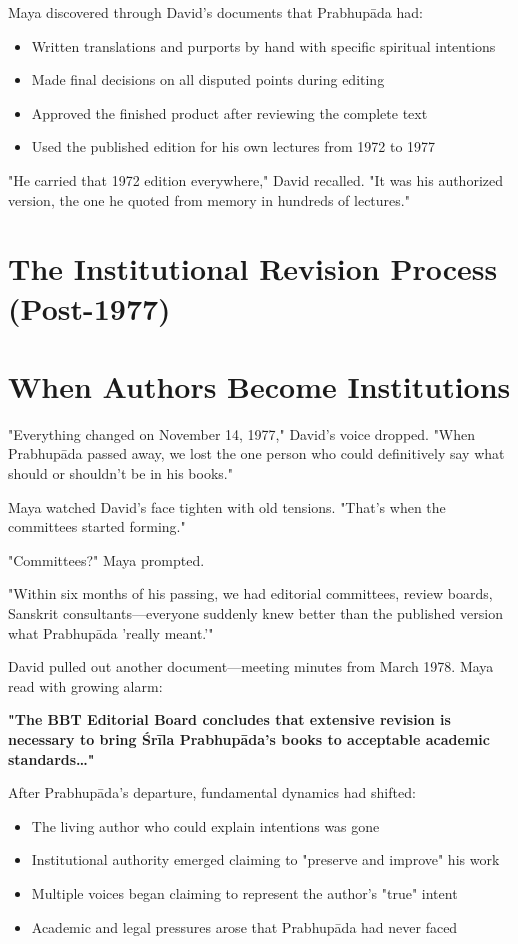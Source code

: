 \documentclass[11pt,twoside]{book}
\begin{document}
Maya discovered through David's documents that Prabhupāda had:
\begin{itemize}
\item Written translations and purports by hand with specific spiritual intentions
\item Made final decisions on all disputed points during editing
\item Approved the finished product after reviewing the complete text
\item Used the published edition for his own lectures from 1972 to 1977
\end{itemize}

"He carried that 1972 edition everywhere," David recalled. "It was his authorized version, the one he quoted from memory in hundreds of lectures."
\section*{The Institutional Revision Process (Post-1977)}
\label{sec:orgbc2545b}

\section*{When Authors Become Institutions}
\label{sec:org9240566}

"Everything changed on November 14, 1977," David's voice dropped. "When Prabhupāda passed away, we lost the one person who could definitively say what should or shouldn't be in his books."

Maya watched David's face tighten with old tensions. "That's when the committees started forming."

"Committees?" Maya prompted.

"Within six months of his passing, we had editorial committees, review boards, Sanskrit consultants—everyone suddenly knew better than the published version what Prabhupāda 'really meant.'"

David pulled out another document—meeting minutes from March 1978. Maya read with growing alarm:

\textbf{"The BBT Editorial Board concludes that extensive revision is necessary to bring Śrīla Prabhupāda's books to acceptable academic standards\ldots{}"}

After Prabhupāda's departure, fundamental dynamics had shifted:
\begin{itemize}
\item The living author who could explain intentions was gone
\item Institutional authority emerged claiming to "preserve and improve" his work
\item Multiple voices began claiming to represent the author's "true" intent
\item Academic and legal pressures arose that Prabhupāda had never faced
\end{itemize}
\end{document}
